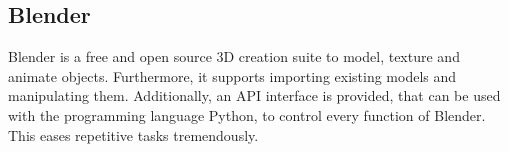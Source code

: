 \subsection{Blender}
\label{sec:software-blender}
Blender \cite{blender} is a free and open source 3D creation suite to model, texture and animate objects.
Furthermore, it supports importing existing models and manipulating them.
Additionally, an API interface is provided, that can be used with the programming language Python, to control every function of Blender.
This eases repetitive tasks tremendously.

